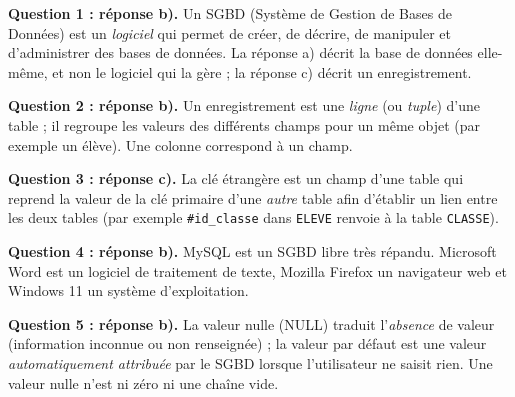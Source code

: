 \documentclass[11pt]{article}
\newcommand{\cle}[1]{{\popxbold\color{popdark}#1}}
\begin{document}
\begin{corrige}
\textbf{Question 1 : réponse b).} Un \cle{SGBD} (Système de Gestion de Bases de Données) est un \emph{logiciel} qui permet de créer, de décrire, de manipuler et d'administrer des \cle{bases de données}. La réponse a) décrit la base de données elle-même, et non le logiciel qui la gère ; la réponse c) décrit un \cle{enregistrement}.

\textbf{Question 2 : réponse b).} Un \cle{enregistrement} est une \emph{ligne} (ou \emph{tuple}) d'une \cle{table} ; il regroupe les valeurs des différents \cle{champs} pour un même objet (par exemple un élève). Une colonne correspond à un champ.

\textbf{Question 3 : réponse c).} La \cle{clé étrangère} est un champ d'une table qui reprend la valeur de la \cle{clé primaire} d'une \emph{autre} table afin d'établir un lien entre les deux tables (par exemple \texttt{\#id\_classe} dans \texttt{ELEVE} renvoie à la table \texttt{CLASSE}).

\textbf{Question 4 : réponse b).} \cle{MySQL} est un SGBD libre très répandu. Microsoft Word est un logiciel de traitement de texte, Mozilla Firefox un navigateur web et Windows 11 un système d'exploitation.

\textbf{Question 5 : réponse b).} La \cle{valeur nulle} (NULL) traduit l'\emph{absence} de valeur (information inconnue ou non renseignée) ; la \cle{valeur par défaut} est une valeur \emph{automatiquement attribuée} par le SGBD lorsque l'utilisateur ne saisit rien. Une valeur nulle n'est ni zéro ni une chaîne vide.
\end{corrige}
\end{document}
